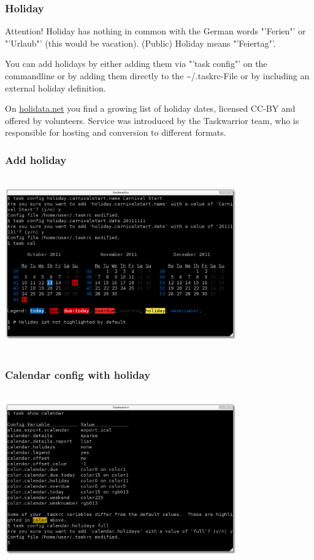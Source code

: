 \documentclass[t,handout]{beamer}
\begin{document}
\begin{frame}
\frametitle{Holiday}
\begin{alertblock}{Attention!}
Holiday has nothing in common with the German words "'Ferien"' or "'Urlaub"' (this would be vacation). (Public) Holiday means "'Feiertag"'.
\end{alertblock}

You can add holidays by either adding them via "'task config"' on the commandline or by adding them directly to the \textasciitilde/.taskrc-File or by including an external holiday definition.

On \href{http://holidata.net/}{holidata.net} you find a growing list of holiday dates, licensed CC-BY and offered by volunteers. Service was introduced by the Taskwarrior team, who is responsible for hosting and conversion to different formats.
\end{frame}

\begin{frame}
\frametitle{Add holiday}
\begin{center}
\includegraphics[width=10cm,height=7.5cm]{holiday_add.png}
\end{center}
\end{frame}

\begin{frame}
\frametitle{Calendar config with holiday}
\begin{center}
\includegraphics[width=10cm,height=7.5cm]{calendar_config_with_holiday_name.png}
\end{center}
\end{frame}
\end{document}
